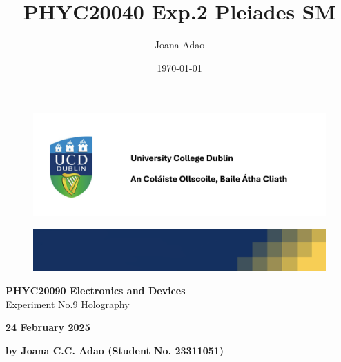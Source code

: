 \documentclass[12pt]{article}
\title{PHYC20040 Exp.2 Pleiades SM}
\author{Joana Adao}
\date{\today}
\begin{document}
\begin{titlepage}
    \begin{center}

        \begin{figure}[ht]
            \includegraphics[width=\textwidth]{UCDLogo.png}
        \end{figure}
        
        \begin{figure}
            \centerline{\includegraphics[width=\paperwidth]{UCDBanner.png}}
        \end{figure}

        \vspace{4cm}

        {\LARGE \bfseries PHYC20090 Electronics and Devices}\\
        \vspace{0.75cm}
        {\Large Experiment No.9 Holography}
        
        \vspace{1cm}
    
    {\Large \textbf{24 February 2025}}

    \vspace{2cm}
    
    {\large \textbf{by Joana C.C. Adao (Student No. 23311051)}}\\

    \end{center}
    
   \clearpage

\end{titlepage}

\setcounter{page}{1}
\tableofcontents

\newpage

\begin{abstract}



\end{abstract}
\end{document}
